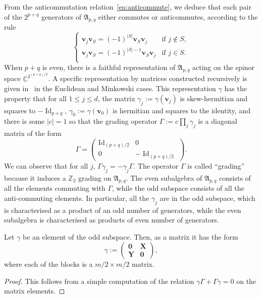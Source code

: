 \documentclass[AHL,Unicode,longabstracts,published]{cedram}
\DeclareMathOperator{\Id}{Id}
\newcommand{\C}{\mathbb C}
\newcommand{\Z}{\mathbb Z}
\newcommand{\BX}{\mathbf X}
\newcommand{\BY}{\mathbf Y}
\newcommand{\bv}{\mathbf v}
\newcommand{\FA}{\mathfrak A}
\newcommand{\abs}[1]{\left\lvert #1 \right\rvert}
\begin{document}
From the anticommutation relation~\eqref{eq:anticommute}, we deduce that each pair of the $2^{p+q}$ generators of $\FA_{p,q}$ either commutes or anticommutes, according to the rule
\begin{equation}
\begin{cases}
\bv_j \bv_S = (-1)^{\abs S} \bv_S \bv_j & \text{if } j \not \in S, \\
\bv_j \bv_S = (-1)^{\abs S - 1} \bv_S \bv_j & \text{if } j \in S. \\
\end{cases}
\end{equation}
When $p+q$ is even, there is a faithful representation of $\FA_{p,q}$ acting on the spinor space $\C^{2^{(p+q)/2}}$. A specific representation by matrices constructed recursively is given in~\cite{Upmeier} in the Euclidean and Minkowski cases. This representation $\gamma$ has the property that for all $1 \le j \le d$, the matrix $\gamma_j := \gamma(\bv_j)$ is skew-hermitian and squares to $-\Id_{p+q}$, $\gamma_0 := \gamma(\bv_0)$ is hermitian and squares to the identity, and there is some $\abs c = 1$ so that the grading operator $\Gamma := c \prod_j \gamma_j$ is a diagonal matrix of the form
\begin{equation}
\Gamma =
\begin{pmatrix}
\Id_{(p+q)/2} & 0 \\
0 & - \Id_{(p+q)/2}
\end{pmatrix}.
\end{equation}
We can observe that for all $j$, $\Gamma \gamma_j = -
\gamma_j \Gamma$. The operator $\Gamma$ is called ``grading'' because it induces a $\Z_2$ grading on $\FA_{p,q}$. The even subalgebra of $\FA_{p,q}$ consists of all the elements commuting with $\Gamma$, while the odd subspace consists of all the anti-commuting elements. In particular, all the $\gamma_j$ are in the odd subspace, which is characterised as a product of an odd number of generators, while the even subalgebra is characterised as products of even number of generators.

\begin{lemm}\label{lem:anticom}
Let $\gamma$ be an element of the odd subspace. Then, as a matrix it has the form
\begin{equation}
\gamma :=
\begin{pmatrix}
\boldsymbol 0 & \BX \\
\BY & \boldsymbol 0
\end{pmatrix},
\end{equation}
where each of the blocks is a $m/2 \times m/2$ matrix.
\end{lemm}
\begin{proof}
This follows from a simple computation of the relation $\gamma \Gamma +
\Gamma \gamma = 0$ on the matrix elements.
\end{proof}
\end{document}
